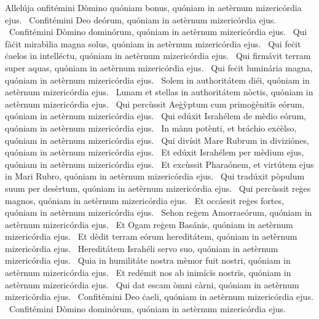 { Allelúja}
{%
onfitémini Dòmino quóniam bonus, quóniam in aetèrnum mizericórdia ejus. 
~Confitémini Deo deórum, quóniam in aetèrnum mizericórdia ejus. 
~Confitémini Dòmino dominórum, quóniam in aetèrnum mizericórdia ejus. 
~Qui fàċit mirabìlia magna solus, quóniam in aetèrnum mizericórdia ejus. 
~Qui feċit ċaelos in intelléctu, quóniam in aetèrnum mizericórdia ejus. 
~Qui firmávit terram super aquas, quóniam in aetèrnum mizericórdia ejus. 
~Qui feċit luminária magna, quóniam in aetèrnum mizericórdia ejus. 
~Solem in authoritátem diéi, quóniam in aetèrnum mizericórdia ejus. 
~Lunam et stellas in authoritátem nòctis, quóniam in aetèrnum mizericórdia ejus. 
~Qui percùssit Aeġỳptum cum primoġènitïs eórum, quóniam in aetèrnum mizericórdia ejus. 
~Qui edúxit Israhélem de mèdio eórum, quóniam in aetèrnum mizericórdia ejus. 
~In mànu potènti, et bráchio exċèlso, quóniam in aetèrnum mizericórdia ejus. 
~Qui divísit Mare Rubrum in diviziónes, quóniam in aetèrnum mizericórdia ejus. 
~Et edúxit Israhélem per mèdium ejus, quóniam in aetèrnum mizericórdia ejus. 
~Et excùssit Pharaónem, et virtútem ejus in Mari Rubro, quóniam in aetèrnum mizericórdia ejus. 
~Qui tradúxit pòpulum suum per desèrtum, quóniam in aetèrnum mizericórdia ejus. 
~Qui percùssit reġes magnos, quóniam in aetèrnum mizericórdia ejus. 
~Et occáesit reġes fortes, quóniam in aetèrnum mizericórdia ejus. 
~Sehon reġem Amorraeórum, quóniam in aetèrnum mizericórdia ejus. 
~Et Ogam reġem Basánis, quóniam in aetèrnum mizericórdia ejus. 
~Et dèdit terram eórum hereditátem, quóniam in aetèrnum mizericórdia ejus. 
~Hereditátem Israhéli servo suo, quóniam in aetèrnum mizericórdia ejus. 
~Quia in humilitáte nostra mèmor fuit nostri, quóniam in aetèrnum mizericórdia ejus. 
~Et redémit nos ab inimícïs nostrïs, quóniam in aetèrnum mizericórdia ejus. 
~Qui dat escam òmni càrni, quóniam in aetèrnum mizericórdia ejus. 
~Confitémini Deo ċaeli, quóniam in aetèrnum mizericórdia ejus. 
~Confitémini Dòmino dominórum, quóniam in aetèrnum mizericórdia ejus. 
}
